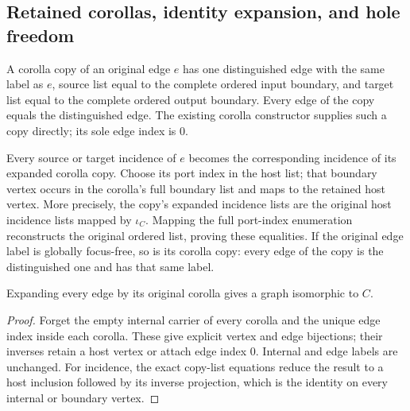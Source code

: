 \subsection{Retained corollas, identity expansion, and hole freedom}
\begin{definition}\label{term:corolla-copy}
A corolla copy of an original edge $e$ has one distinguished edge with the
same label as $e$, source list equal to the complete ordered input boundary,
and target list equal to the complete ordered output boundary. Every edge
of the copy equals the distinguished edge. The existing corolla constructor
supplies such a copy directly; its sole edge index is $0$.
\end{definition}

Every source or target incidence of $e$ becomes the corresponding incidence
of its expanded corolla copy. Choose its port index in the host list; that
boundary vertex occurs in the corolla's full boundary list and maps to the
retained host vertex. More precisely, the copy's expanded incidence lists
are the original host incidence lists mapped by $\iota_C$. Mapping the full
port-index enumeration reconstructs the original ordered list, proving these
equalities. If the original edge label is globally focus-free, so is its
corolla copy: every edge of the copy is the distinguished one and has that
same label.

\begin{theorem}
Expanding every edge by its original corolla gives a graph isomorphic to $C$.
\end{theorem}
\begin{proof}
Forget the empty internal carrier of every corolla and the unique edge index
inside each corolla. These give explicit vertex and edge bijections; their
inverses retain a host vertex or attach edge index $0$. Internal and edge
labels are unchanged. For incidence, the exact copy-list equations reduce
the result to a host inclusion followed by its inverse projection, which
is the identity on every internal or boundary vertex.
\end{proof}

